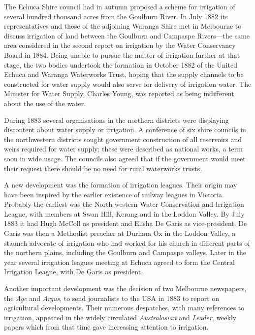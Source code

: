The Echuca Shire council had in autumn proposed a scheme for
irrigation of several hundred thousand acres from the Goulburn
River.  In July 1882 its
representatives and those of the adjoining Waranga Shire met in
Melbourne to discuss irrigation of land between the Goulburn and
Campaspe Rivers---the same area considered in the second report on
irrigation by the Water Conservancy Board in 1884.  Being unable to pursue
the matter of irrigation further at that stage, the two bodies
undertook the formation in October 1882 of the United Echuca and
Waranga Waterworks Trust, hoping that the supply channels to be
constructed for water supply would also serve for delivery of
irrigation water.  The
Minister for Water Supply, Charles Young, was reported as being
indifferent about the use of the water.

During 1883 several organisations in the northern districts were
displaying discontent about water supply or irrigation.  A conference
of six shire councils in the northwestern districts sought government
construction of all reservoirs and weirs required for water supply;
these were described as national works, a term soon in wide
usage.  The councils also agreed that
if the government would meet their request there should be no need for
rural waterworks trusts.

A new development was the formation of irrigation leagues.  Their
origin may have been inspired by the earlier existence of railway
leagues in Victoria.  Probably the earliest was the North-western
Water Conservation and Irrigation League, with members at Swan Hill,
Kerang and in the Loddon Valley.  By July 1883 it had Hugh McColl as
president and Elisha De Garis as vice-president.\fn{Australasian, 3
July 1883.}  De Garis was then a Methodist preacher at Durham Ox in
the Loddon Valley, a staunch advocate of irrigation who had worked for
his church in different parts of the northern plains, including the
Goulburn and Campaspe valleys.  Later in the year several irrigation
leagues meeting at Echuca agreed to form the Central Irrigation
League, with De Garis as president.

Another important development was the decision of two Melbourne
newspapers, the \textsl{Age} and \textsl{Argus}, to send journalists
to the USA in 1883 to report on agricultural developments.  Their
numerous despatches, with many references to irrigation, appeared in
the widely circulated \textsl{Australasian} and \textsl{Leader},
weekly papers which from that time gave increasing attention to
irrigation.


